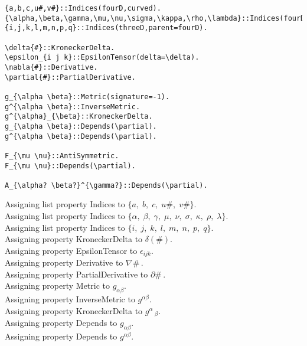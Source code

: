 \documentclass[11pt]{article}
\begin{document}
{\color[named]{Blue}\begin{verbatim}
{a,b,c,u#,v#}::Indices(fourD,curved).
{\alpha,\beta,\gamma,\mu,\nu,\sigma,\kappa,\rho,\lambda}::Indices(fourD,curved).
{i,j,k,l,m,n,p,q}::Indices(threeD,parent=fourD).

\delta{#}::KroneckerDelta.
\epsilon_{i j k}::EpsilonTensor(delta=\delta).
\nabla{#}::Derivative.
\partial{#}::PartialDerivative.

g_{\alpha \beta}::Metric(signature=-1).
g^{\alpha \beta}::InverseMetric.
g^{\alpha}_{\beta}::KroneckerDelta.
g_{\alpha \beta}::Depends(\partial).
g^{\alpha \beta}::Depends(\partial).

F_{\mu \nu}::AntiSymmetric.
F_{\mu \nu}::Depends(\partial).

A_{\alpha? \beta?}^{\gamma?}::Depends(\partial).
\end{verbatim}}
Assigning list property Indices to $\{a,\; b,\; c,\; u\#,\; v\#\}$.
\\
Assigning list property Indices to $\{\alpha,\; \beta,\; \gamma,\; \mu,\; \nu,\; \sigma,\; \kappa,\; \rho,\; \lambda\}$.
\\
Assigning list property Indices to $\{i,\; j,\; k,\; l,\; m,\; n,\; p,\; q\}$.
\\
Assigning property KroneckerDelta to $\delta(\#)$.
\\
Assigning property EpsilonTensor to ${\epsilon}_{i j k}$.
\\
Assigning property Derivative to $\nabla{\#}\, $.
\\
Assigning property PartialDerivative to $\partial{\#}\, $.
\\
Assigning property Metric to ${g}_{\alpha \beta}$.
\\
Assigning property InverseMetric to ${g}^{\alpha \beta}$.
\\
Assigning property KroneckerDelta to ${g}^{\alpha}\,_{\beta}$.
\\
Assigning property Depends to ${g}_{\alpha \beta}$.
\\
Assigning property Depends to ${g}^{\alpha \beta}$.
\\
\end{document}
